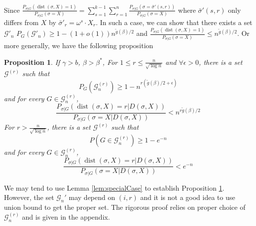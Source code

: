 \documentclass[journal]{IEEEtran}
\newtheorem{proposition}{Proposition}
\newcommand{\cG}{\mathcal{G}}
\newcommand{\1}{\mathbbm{1}}
\DeclareMathOperator{\dist}{dist}
\begin{document}
Since 
$\frac{P_{\sigma |G } (\dist(\sigma, X)=1)}{P_{\sigma |G } (\sigma = X)} = \sum_{s=1}^{k-1}
\sum_{r=1}^n \frac{P_{\sigma |G } (\sigma = \bar{\sigma}'(s,r))}{P_{\sigma |G } (\sigma = X)}$ 
where $\bar{\sigma}'(s,r)$ only differs from $X$ by $\bar{\sigma}'_r = \omega^s \cdot X_r$.
In such a case, we can show that there exists a set $\cG'_n$
$P_G(\cG'_n) \geq 1 - (1+o(1))n^{\tilde{g}(\beta)/2}$ and 
$\frac{P_{\sigma |G } (\dist(\sigma, X)=1)}{P_{\sigma |G } (\sigma = X)} \leq n^{\tilde{g}(\beta)/2}$.
Or more generally, we have the following proposition
\begin{proposition}\label{prop:small}
If $\gamma>b$, $\beta>\beta^\ast$,
For $1\leq r \leq \frac{n}{\sqrt{\log n}}$
and $\forall \epsilon > 0$, there is a set $\cG^{(r)}$ such that
\begin{equation}\label{eq:Gr}
P_G(\cG^{(r)}_n) \ge 1 - n^{r(\tilde{g}(\beta)/2 + \epsilon)}
\end{equation}
and
for every $G\in\cG^{(r)}_n$,
\begin{equation}\label{eq:psigmaX}
\frac{P_{\sigma|G}(\dist(\sigma, X)=r | D(\sigma, X))}
{P_{\sigma|G}(\sigma=X | D(\sigma, X))} <
n^{r \tilde{g}(\beta) /2}
\end{equation}
For $r> \frac{n}{\sqrt{\log n}}$, there is a set $\cG^{(r)}$ such that
\begin{equation}\label{eq:Gr1}
P(G\in\cG^{(r)}_n) \ge 1 - e^{-n}
\end{equation}
and
for every $G\in\cG^{(r)}_n$,
\begin{equation}\label{eq:psigmaX1}
\frac{P_{\sigma|G}(\dist(\sigma, X)=r | D(\sigma, X))}
{P_{\sigma|G}(\sigma=X | D(\sigma, X))} <
e^{-n}
\end{equation}
\end{proposition}
We may tend to use Lemma \ref{lem:specialCase} to establish Proposition \ref{prop:small}. However, the set $\cG_n'$ may depend
on $(i,r)$ and it is not a good idea to use union bound to get the proper set. The rigorous proof relies on
proper choice of $\cG_n^{(r)}$
and is given in
the appendix.
\end{document}
